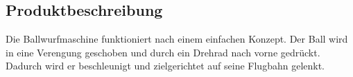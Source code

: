 \subsection{Produktbeschreibung}

Die Ballwurfmaschine funktioniert nach einem einfachen Konzept. Der Ball wird in eine Verengung geschoben und durch ein Drehrad nach vorne gedrückt. Dadurch wird er beschleunigt und zielgerichtet auf seine Flugbahn gelenkt. 


\newpage

\newpage

\newpage